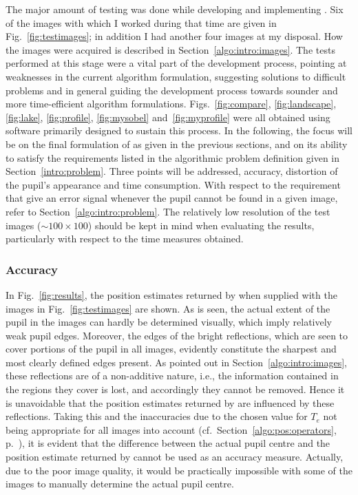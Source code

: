 The major amount of testing was done while developing and implementing
{\octopus}.  Six of the images with which I worked during that time
are given in Fig.~\ref{fig:testimages}; in addition I had another four
images at my disposal.  How the images were acquired is described in
Section~\ref{algo:intro:images}.  The tests performed at this stage
were a vital part of the development process, pointing at weaknesses
in the current algorithm formulation, suggesting solutions to
difficult problems and in general guiding the development process
towards sounder and more time-efficient algorithm formulations.
Figs.~\ref{fig:compare}, \ref{fig:landscape}, \ref{fig:lake},
\ref{fig:profile}, \ref{fig:mysobel} and~\ref{fig:myprofile} were all
obtained using software primarily designed to sustain this process.
In the following, the focus will be on the final formulation of
{\octopus} as given in the previous sections, and on its ability to
satisfy the requirements listed in the algorithmic problem definition
given in Section~\ref{intro:problem}.  Three points will be addressed,
accuracy, distortion of the pupil's appearance and time consumption.
With respect to the requirement that {\octopus} give an error signal
whenever the pupil cannot be found in a given image, refer to
Section~\ref{algo:intro:problem}.  The relatively low resolution of
the test images ($\sim 100\times 100$) should be kept in mind when
evaluating the results, particularly with respect to the time measures
obtained.

\subsubsection{Accuracy}

In Fig.~\ref{fig:results}, the position estimates returned by
{\octopus} when supplied with the images in Fig.~\ref{fig:testimages}
are shown.  As is seen, the actual extent of the pupil in the images
can hardly be determined visually, which imply relatively weak pupil
edges.  Moreover, the edges of the bright reflections, which are seen
to cover portions of the pupil in all images, evidently constitute the
sharpest and most clearly defined edges present.  As pointed out in
Section~\ref{algo:intro:images}, these reflections are of a
non-additive nature, i.e., the information contained in the regions
they cover is lost, and accordingly they cannot be removed.  Hence it
is unavoidable that the position estimates returned by {\octopus} are
influenced by these reflections.  Taking this and the inaccuracies
due to the chosen value for $T_{e}$ not being appropriate for all
images into account (cf.\ Section~\ref{algo:pos:operators},
p.~\pageref{pg:TEproblems}), it is evident that the difference between
the actual pupil centre and the position estimate returned by
{\octopus} cannot be used as an accuracy measure.  Actually, due to
the poor image quality, it would be practically impossible with some
of the images to manually determine the actual pupil centre.

